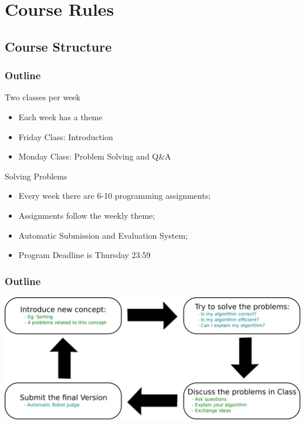 \documentclass{beamer}
\begin{document}
\section{Course Rules}
\subsection{Course Structure}

\begin{frame}
    \frametitle{Outline}
    
    \begin{block}{Two classes per week}
        \begin{itemize}   
        \item Each week has a theme
        \item Friday Class: Introduction
        \item Monday Class: Problem Solving and Q\&A
        \end{itemize}
    \end{block}
    
    \begin{block}{Solving Problems}
        \begin{itemize}
        \item Every week there are 6-10 programming assignments;
        \item Assignments follow the weekly theme;
        \item Automatic Submission and Evaluation System;
        \item Program Deadline is Thursday 23:59
        \end{itemize}
    \end{block}
\end{frame}
    
\begin{frame}
  \frametitle{Outline}
  \begin{center}
    \includegraphics[width=1\textwidth]{../img/classoutline}
  \end{center}
\end{frame}
\end{document}
